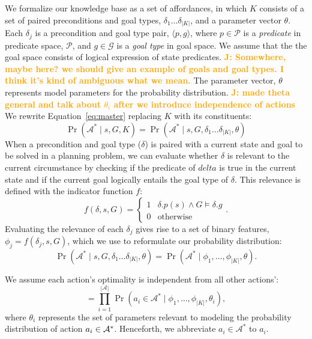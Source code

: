 \documentclass[conference]{IEEEtran}
\newcommand{\jnote}[1]{\textcolor{Orange}{\textbf{J: #1}}}
\begin{document}
We formalize our knowledge base as a set of affordances, in which $K$
consists of a set of paired preconditions and goal types, $\delta_1
\ldots \delta_{|K|}$, and a parameter vector $\theta$.  Each
$\delta_j$ is a precondition and goal type pair, $\langle p, g
\rangle$, where $p \in \mathcal{P}$
is a {\it predicate} in predicate space, $\mathcal{P}$, and $g \in
\mathcal{G}$ is a {\it goal type} in goal space. We assume that
the the goal space consists of logical expression of state predicates.
\jnote{Somewhere, maybe here? we should give an example of goals and goal types.
I think it's kind of ambiguous what we mean.} 
The parameter vector, $\theta$ represents model parameters for
the probability distribution.
\jnote{made theta general and talk about $\theta_i$ after we introduce
independence of actions} We
rewrite Equation~\ref{eq:master} replacing $K$ with its constituents:
\begin{equation}
\Pr(\mathcal{A}^* \mid s, G, K) = \Pr(\mathcal{A}^* \mid s, G, \delta_1 \ldots \delta_{|K|}, \theta)
\end{equation}
When a precondition and goal type ($\delta$) is paired with a current state and goal to be solved in a planning problem, we can evaluate whether $\delta$ is relevant to the current circumstance by checking if the predicate of $delta$ is true in the current state and if the current goal logically entails the goal type of $\delta$. This relevance is defined with the indicator function $f$:
\begin{equation}
f(\delta, s, G) = 
\begin{cases}
1& \delta.p(s) \wedge G \models \delta.g \\
0& \text{otherwise}
\end{cases}.
\label{eq:f_func_def}
\end{equation}
Evaluating the relevance of each $\delta_j$ gives rise to a set of binary features, $\phi_j = f(\delta_j, s, G)$, which we use to reformulate our probability distribution:
\begin{equation}
\Pr(\mathcal{A}^* \mid s, G, \delta_1 \ldots \delta_{|K|}, \theta) = \Pr(\mathcal{A}^* \mid \phi_1, \ldots, \phi_{|K|}, \theta).
\label{eq:feature_rep}
\end{equation}

We assume each action's optimality is independent from all other actions':
\begin{equation}
= \prod_{i=1}^{|\mathcal{A}|} \Pr(a_i \in \mathcal{A}^* \mid \phi_1, \ldots, \phi_{|K|}, \theta_i),
\label{eq:action_independ}
\end{equation}
where $\theta_i$ represents the set of parameters relevant to modeling the probability distribution of action $a_i \in {\cal A}^*$. Henceforth, we abbreviate $a_i \in \mathcal{A}^*$ to $a_i$.
\end{document}
